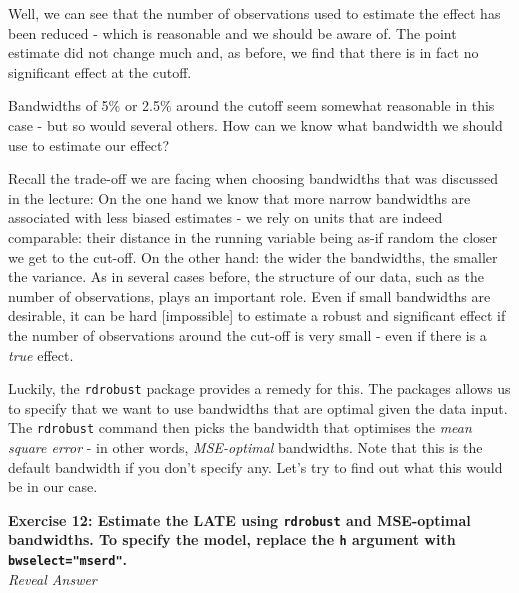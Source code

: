 \documentclass[
  letterpaper,
  DIV=11,
  numbers=noendperiod]{scrreprt}
\newenvironment{Shaded}{\begin{snugshade}}{\end{snugshade}}
\newcommand{\AttributeTok}[1]{\textcolor[rgb]{0.40,0.45,0.13}{#1}}
\newcommand{\DecValTok}[1]{\textcolor[rgb]{0.68,0.00,0.00}{#1}}
\newcommand{\FunctionTok}[1]{\textcolor[rgb]{0.28,0.35,0.67}{#1}}
\newcommand{\NormalTok}[1]{\textcolor[rgb]{0.00,0.23,0.31}{#1}}
\newcommand{\OtherTok}[1]{\textcolor[rgb]{0.00,0.23,0.31}{#1}}
\newcommand{\SpecialCharTok}[1]{\textcolor[rgb]{0.37,0.37,0.37}{#1}}
\newcommand{\StringTok}[1]{\textcolor[rgb]{0.13,0.47,0.30}{#1}}
\begin{document}
Well, we can see that the number of observations used to estimate the
effect has been reduced - which is reasonable and we should be aware of.
The point estimate did not change much and, as before, we find that
there is in fact no significant effect at the cutoff.

\hfill\break

Bandwidths of 5\% or 2.5\% around the cutoff seem somewhat reasonable in
this case - but so would several others. How can we know what bandwidth
we should use to estimate our effect?

Recall the trade-off we are facing when choosing bandwidths that was
discussed in the lecture: On the one hand we know that more narrow
bandwidths are associated with less biased estimates - we rely on units
that are indeed comparable: their distance in the running variable being
as-if random the closer we get to the cut-off. On the other hand: the
wider the bandwidths, the smaller the variance. As in several cases
before, the structure of our data, such as the number of observations,
plays an important role. Even if small bandwidths are desirable, it can
be hard {[}impossible{]} to estimate a robust and significant effect if
the number of observations around the cut-off is very small - even if
there is a \emph{true} effect.

Luckily, the \texttt{rdrobust} package provides a remedy for this. The
packages allows us to specify that we want to use bandwidths that are
optimal given the data input. The \texttt{rdrobust} command then picks
the bandwidth that optimises the \emph{mean square error} - in other
words, \emph{MSE-optimal} bandwidths. Note that this is the default
bandwidth if you don't specify any. Let's try to find out what this
would be in our case.

\textbf{Exercise 12: Estimate the LATE using \texttt{rdrobust} and
MSE-optimal bandwidths. To specify the model, replace the \texttt{h}
argument with \texttt{bwselect="mserd"}.}\\

\emph{Reveal Answer}

\begin{Shaded}
\end{Shaded}
\end{document}
